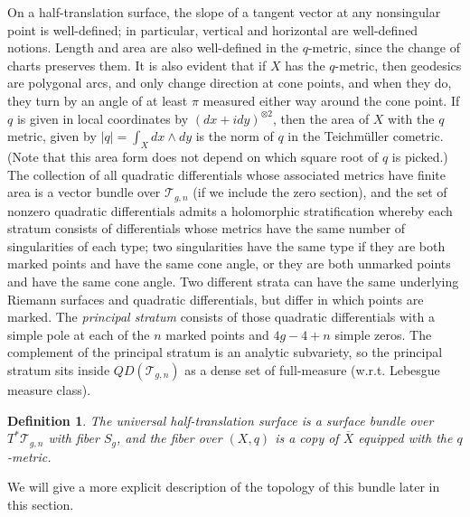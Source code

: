 \documentclass[12pt]{article}
\newtheorem{definition}[theorem]{Definition}
\begin{document}
\noindent On a half-translation surface, the slope of a tangent vector at any nonsingular point is well-defined; in particular, vertical and horizontal are well-defined notions. Length and area are also well-defined in the $q$-metric, since the change of charts preserves them. It is also evident that if $X$ has the $q$-metric, then geodesics are polygonal arcs, and only change direction at cone points, and when they do, they turn by an angle of at least $\pi$ measured either way around the cone point. If $q$ is given in local coordinates by $(dx + i dy)^{\otimes 2}$, then the area of $X$ with the $q$ metric, given by $|q| = \int_X dx \wedge dy$ is the norm of $q$ in the Teichm\"uller cometric. (Note that this area form does not depend on which square root of $q$ is picked.)\\

\noindent The collection of all quadratic differentials whose associated metrics have finite area is a vector bundle over $\mathcal{T}_{g,n}$ (if we include the zero section), and the set of nonzero quadratic differentials admits a holomorphic stratification whereby each stratum consists of differentials whose metrics have the same number of singularities of each type; two singularities have the same type if they are both marked points and have the same cone angle, or they are both unmarked points and have the same cone angle. Two different strata can have the same underlying Riemann surfaces and quadratic differentials, but differ in which points are marked. The \emph{principal stratum} consists of those quadratic differentials with a simple pole at each of the $n$ marked points and $4g-4+n$ simple zeros. The complement of the principal stratum is an analytic subvariety, so the principal stratum sits inside $QD(\mathcal{T}_{g,n})$ as a dense set of full-measure (w.r.t. Lebesgue measure class).

\begin{definition} The \emph{universal half-translation surface} is a surface bundle over $T^*\mathcal{T}_{g,n}$ with fiber $S_g$, and the fiber over $(X,q)$ is a copy of $\overline{X}$ equipped with the $q$-metric.\end{definition}

\noindent We will give a more explicit description of the topology of this bundle later in this section.\\
\end{document}
